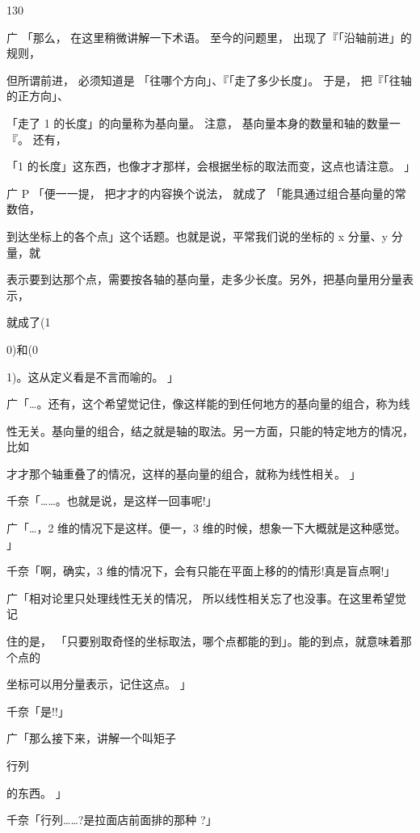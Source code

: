 130\par
广 「那么， 在这里稍微讲解一下术语。 至今的问题里， 出现了『「沿轴前进」的规则，\par
但所谓前进， 必须知道是 「往哪个方向」、『「走了多少长度」。 于是， 把『「往轴的正方向」、\par
「走了 1 的长度」的向量称为基向量。 注意， 基向量本身的数量和轴的数量一『。 还有，\par
「1 的长度」这东西，也像才才那样，会根据坐标的取法而变，这点也请注意。 」\par
广 P 「便一一提， 把才才的内容换个说法， 就成了 「能具通过组合基向量的常数倍，\par
到达坐标上的各个点」这个话题。也就是说，平常我们说的坐标的 x 分量、y 分量，就\par
表示要到达那个点，需要按各轴的基向量，走多少长度。另外，把基向量用分量表示，\par
就成了(1\par
0)和(0\par
1)。这从定义看是不言而喻的。 」\par
广「…。还有，这个希望觉记住，像这样能的到任何地方的基向量的组合，称为线\par
性无关。基向量的组合，结之就是轴的取法。另一方面，只能的特定地方的情况，比如\par
才才那个轴重叠了的情况，这样的基向量的组合，就称为线性相关。 」\par
千奈「……。也就是说，是这样一回事呢!」\par
广「…，2 维的情况下是这样。便一，3 维的时候，想象一下大概就是这种感觉。 」\par
千奈「啊，确实，3 维的情况下，会有只能在平面上移的的情形!真是盲点啊!」\par
广「相对论里只处理线性无关的情况， 所以线性相关忘了也没事。在这里希望觉记\par
住的是， 「只要别取奇怪的坐标取法，哪个点都能的到」。能的到点，就意味着那个点的\par
坐标可以用分量表示，记住这点。 」\par
千奈「是!!」\par
广「那么接下来，讲解一个叫矩子\par
行列\par
的东西。 」\par
千奈「行列……?是拉面店前面排的那种 ?」\par


